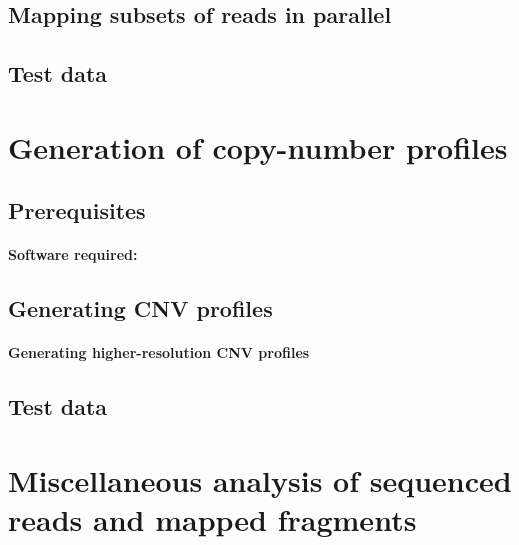 \documentclass[11pt]{article}
\begin{document}
\subsection{Mapping subsets of reads in parallel}


\subsection{Test data}


\section{Generation of copy-number profiles}
\label{cnv}

\subsection{Prerequisites}
\paragraph{Software required:}

\subsection{Generating CNV profiles}

\paragraph{Generating higher-resolution CNV profiles}

\subsection{Test data}


\section{Miscellaneous analysis of sequenced reads and mapped fragments}
\label{misc}
\end{document}
